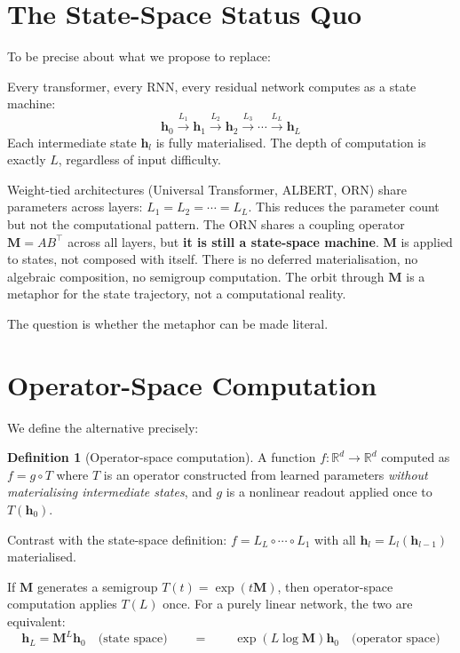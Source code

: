 \documentclass[11pt, a4paper]{article}
\newcommand{\M}{\mathbf{M}}
\newcommand{\h}{\mathbf{h}}
\newcommand{\R}{\mathbb{R}}
\theoremstyle{plain}
\theoremstyle{definition}
\newtheorem{definition}{Definition}
\theoremstyle{remark}
\begin{document}
\section{The State-Space Status Quo}

To be precise about what we propose to replace:

Every transformer, every RNN, every residual network computes as a state machine:
\begin{equation}
\h_0 \xrightarrow{L_1} \h_1 \xrightarrow{L_2} \h_2 \xrightarrow{L_3} \cdots \xrightarrow{L_L} \h_L
\end{equation}
Each intermediate state $\h_l$ is fully materialised.
The depth of computation is exactly $L$, regardless of input difficulty.

Weight-tied architectures (Universal Transformer, ALBERT, ORN) share parameters across layers: $L_1 = L_2 = \cdots = L_L$.
This reduces the parameter count but not the computational pattern.
The ORN shares a coupling operator $\M = AB^\top$ across all layers, but \textbf{it is still a state-space machine}.
$\M$ is applied to states, not composed with itself.
There is no deferred materialisation, no algebraic composition, no semigroup computation.
The orbit through $\M$ is a metaphor for the state trajectory, not a computational reality.

The question is whether the metaphor can be made literal.


\section{Operator-Space Computation}

We define the alternative precisely:

\begin{definition}[Operator-space computation]
A function $f: \R^d \to \R^d$ computed as $f = g \circ T$ where $T$ is an operator constructed from learned parameters \emph{without materialising intermediate states}, and $g$ is a nonlinear readout applied once to $T(\h_0)$.
\end{definition}

Contrast with the state-space definition: $f = L_L \circ \cdots \circ L_1$ with all $\h_l = L_l(\h_{l-1})$ materialised.

If $\M$ generates a semigroup $T(t) = \exp(t\M)$, then operator-space computation applies $T(L)$ once.
For a purely linear network, the two are equivalent:
\begin{equation}
\h_L = \M^L \h_0 \quad \text{(state space)} \qquad = \qquad \exp(L \log \M) \h_0 \quad \text{(operator space)}
\end{equation}
\end{document}

